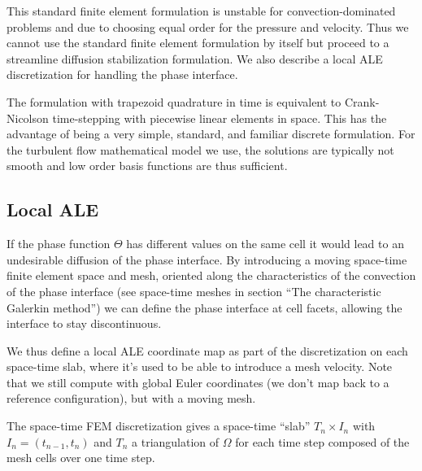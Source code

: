 This standard finite element formulation is unstable for
convection-dominated problems and due to choosing equal order for the
pressure and velocity. Thus we cannot use the standard finite element
formulation by itself but proceed to a streamline diffusion stabilization
formulation. We also describe a local ALE discretization for handling
the phase interface.

The \cgone{}\cgone{} formulation with trapezoid quadrature in time
is equivalent to Crank-Nicolson time-stepping with piecewise linear
elements in space. This has the advantage of being a very simple,
standard, and familiar discrete formulation. For the turbulent flow
mathematical model we use, the solutions are typically not smooth and
low order basis functions are thus sufficient.

\subsection{Local ALE}

If the phase function $\Theta$ has different values on the same cell
it would lead to an undesirable diffusion of the phase interface. By
introducing a moving space-time finite element space and mesh, oriented
along the characteristics of the convection of the phase interface
\citep{ErikssonEstepHansboEtAl1996} (see space-time meshes in section
``The characteristic Galerkin method'') we can define the phase interface
at cell facets, allowing the interface to stay discontinuous.

We thus define a local ALE coordinate map
\citep{ErikssonEstepHansboEtAl1996} as part of the discretization on
each space-time slab, where it's used to be able to introduce a mesh
velocity. Note that we still compute with global Euler coordinates
(we don't map back to a reference configuration), but with a moving mesh.

The space-time FEM discretization gives a space-time ``slab'' $T_n \times
I_n$ with $I_n = (t_{n-1}, t_n)$ and $T_n$ a triangulation of $\Omega$
for each time step composed of the mesh cells over one time step.

